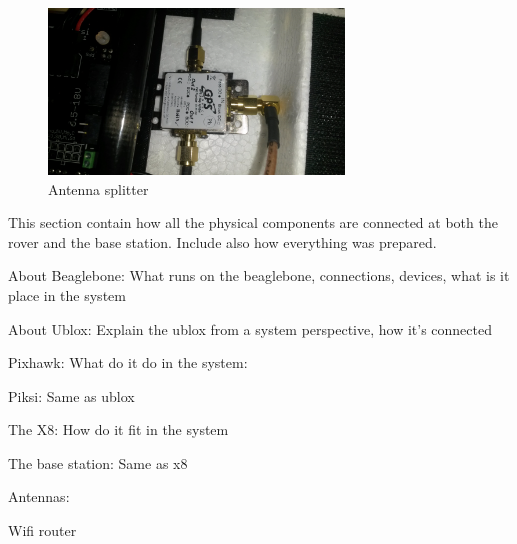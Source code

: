 \begin{figure}[H]
	\centering
		\includegraphics[width=0.7\textwidth]{figs/066.jpg}
		\caption{Antenna splitter}
		\label{figure:AntennaSplitter}
\end{figure}

This section contain how all the physical components are connected at both the rover and the base station. Include also how everything was prepared.

About Beaglebone: What runs on the beaglebone, connections, devices, what is it place in the system

About Ublox: Explain the ublox from a system perspective, how it's connected

Pixhawk: What do it do in the system:

Piksi: Same as ublox

The X8: How do it fit in the system

The base station: Same as x8

Antennas: 

Wifi router

